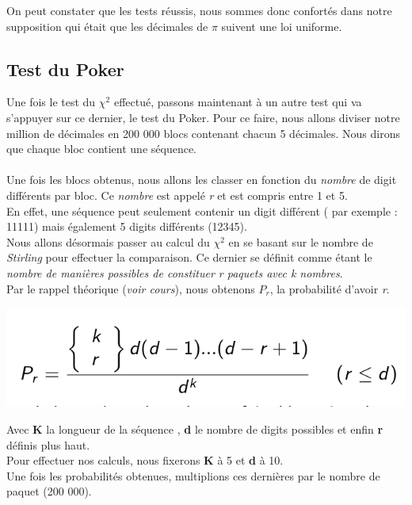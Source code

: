 \documentclass[french]{article}
\begin{document}
On peut constater que les tests réussis, nous sommes donc confortés dans notre supposition qui était que les décimales de $\pi$ suivent une loi uniforme.
\\

\subsection{Test du Poker}
Une fois le test du $\chi^{2}$ effectué, passons maintenant à un autre test qui va s'appuyer sur ce dernier, le test du Poker. Pour ce faire, nous allons diviser notre million de décimales en 200 000 blocs contenant chacun 5 décimales. Nous dirons que chaque bloc contient une séquence.
\\
\\
Une fois les blocs obtenus, nous allons les classer en fonction du \textit{nombre} de digit différents par bloc. Ce \textit{nombre} est appelé \textit{r} et est compris entre 1 et 5.
\\
En effet, une séquence peut seulement contenir un digit différent ( par exemple : 11111) mais également 5 digits différents (12345).
\\
Nous allons désormais passer au calcul du $\chi^{2}$ en se basant sur le nombre de \textit{Stirling} pour
effectuer la comparaison. Ce dernier se définit comme étant le \textit{nombre de manières possibles de constituer r paquets avec k nombres}.
\\
Par le rappel théorique (\textit{voir cours}), nous obtenons $P_{r}$, la probabilité d'avoir \textit{r}.

	\begin{center}
		\includegraphics[scale=0.60]{Archives/Images/probaR}
	\end{center}

Avec \textbf{K} la longueur de la séquence , \textbf{d} le nombre de digits possibles et enfin \textbf{r}
définis plus haut.
\\
Pour effectuer nos calculs, nous fixerons \textbf{K} à 5 et \textbf{d} à 10.
\\
Une fois les probabilités obtenues, multiplions ces dernières par le nombre de paquet (200 000).
\end{document}
